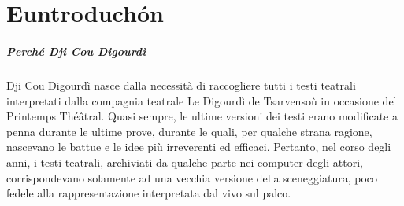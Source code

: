 \chapter*{Euntroduch\'on} 






\paragraph*{Perché Dji Cou Digourdì}
Dji Cou Digourdì nasce dalla necessità di raccogliere tutti i testi teatrali interpretati dalla compagnia teatrale Le Digourdì de Tsarvensoù in occasione del Printemps Thé\^atral. Quasi sempre, le ultime versioni dei testi erano modificate a penna durante le ultime prove, durante le quali, per qualche strana ragione, nascevano le battue e le idee più irreverenti ed efficaci. Pertanto, nel corso degli anni, i testi teatrali, archiviati da qualche parte nei computer degli attori, corrispondevano solamente ad una vecchia versione della sceneggiatura, poco fedele alla rappresentazione interpretata dal vivo sul palco.

